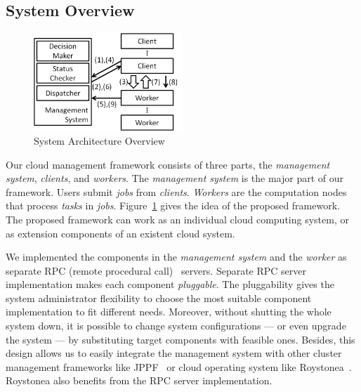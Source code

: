 


\subsection{System Overview}	%

\begin{figure}[htbp]
\centering
\includegraphics[width = 0.5\textwidth, bb=0 0 490 350]{./figures/flow.png}
\caption{System Architecture Overview}
\label{fig:archi-overview}
\end{figure}

Our cloud management framework consists of three parts, the \emph{
management system}, \emph{clients}, and \emph{workers}.  
The \emph{management system} is the major part of our framework.  
Users submit \emph{jobs} from \emph{clients}.
\emph{Workers} are the computation nodes that process \emph{tasks} in 
\emph{jobs}.
Figure~\ref{fig:archi-overview} gives the idea of the proposed 
framework.
The proposed framework can work as an individual cloud computing 
system, or as extension components of an existent cloud system.

We implemented the components in the \emph{management system} and the 
\emph{worker} as separate RPC (remote procedural call)~\cite{cite:RPC} 
servers.
Separate RPC server implementation makes each component \emph{pluggable}.
The pluggability gives the system administrator flexibility to choose
the most suitable component implementation to fit different needs.
Moreover, without shutting the whole system down, it is possible to
change system configurations --- or even upgrade the system --- by
substituting target components with feasible ones.
Besides, this design allows us to easily integrate the management system
with other cluster management frameworks like JPPF~\cite{cite:JPPF} or
cloud operating system like Roystonea~\cite{cite:roystonea}.
Roystonea also benefits from the RPC server implementation.


